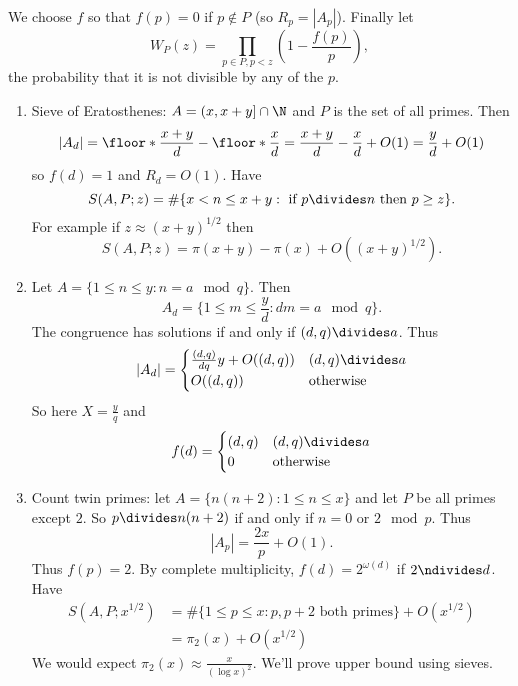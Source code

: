 \documentclass[a4paper]{article}
\begin{document}
We choose \(f\) so that \(f(p) = 0\) if \(p \notin P\) (so \(R_p = |A_p|\)). Finally let
\[
  W_P(z) = \prod_{p \in P, p < z} \left( 1 - \frac{f(p)}{p} \right),
\]
the probability that it is not divisible by any of the \(p\).

\begin{eg}\leavevmode
  \begin{enumerate}
  \item Sieve of Eratosthenes: \(A = (x, x + y] \cap \N\) and \(P\) is the set of all primes. Then
    \[
      |A_d|
      = \floor*{\frac{x + y}{d}} - \floor*{\frac{x}{d}}
      = \frac{x + y}{d} - \frac{x}{d} + O(1)
      = \frac{y}{d} + O(1)
    \]
    so \(f(d) = 1\) and \(R_d = O(1)\). Have
    \[
      S(A, P; z) = \#\{x < n \leq x + y: \text{ if } p \divides n \text{ then } p \geq z\}.
    \]
    For example if \(z \approx (x + y)^{1/2}\) then
    \[
      S(A, P; z) = \pi(x + y) - \pi(x) + O((x + y)^{1/2}).
    \]
  \item Let \(A = \{1 \leq n \leq y: n = a \mod q\}\). Then
    \[
      A_d = \{1 \leq m \leq \frac{y}{d}: dm = a \mod q\}.
    \]
    The congruence has solutions if and only if \((d, q) \divides a\). Thus
    \[
      |A_d| =
      \begin{cases}
        \frac{(d, q)}{dq} y + O((d, q)) & (d, q) \divides a \\
        O((d, q)) & \text{otherwise}
      \end{cases}
    \]
    So here \(X = \frac{y}{q}\) and
    \[
      f(d) =
      \begin{cases}
        (d, q) & (d, q) \divides a \\
        0 & \text{otherwise}
      \end{cases}
    \]
  \item Count twin primes: let \(A = \{n (n + 2): 1 \leq n \leq x\}\) and let \(P\) be all primes except \(2\). So \(p \divides n(n + 2)\) if and only if \(n = 0 \text{ or } 2 \mod p\). Thus
    \[
      |A_p| = \frac{2x}{p} + O(1).
    \]
    Thus \(f(p) = 2\). By complete multiplicity, \(f(d) = 2^{\omega(d)}\) if \(2 \ndivides d\). Have
    \begin{align*}
      S(A, P; x^{1/2})
      &= \#\{1 \leq p \leq x: p, p + 2 \text{ both primes}\} + O(x^{1/2}) \\
      &= \pi_2(x) + O(x^{1/2})
    \end{align*}
    We would expect \(\pi_2(x) \approx \frac{x}{(\log x)^2}\). We'll prove upper bound using sieves.
  \end{enumerate}
\end{eg}
\end{document}
